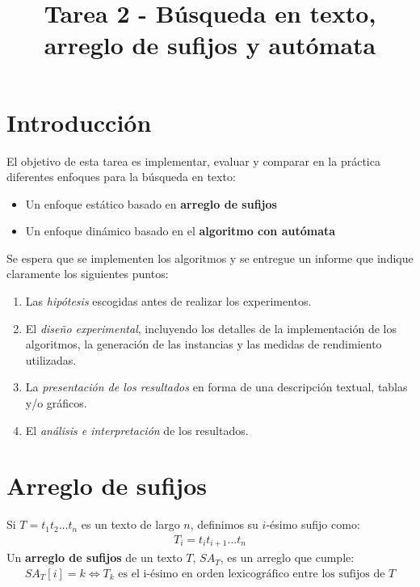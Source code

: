 \documentclass[dcc,uchile]{fcfmcourse}
\title{Tarea 2 - Búsqueda en texto, arreglo de sufijos y autómata}
\begin{document}
\captionsetup[table]{name=Tabla}
\captionsetup[table]{name=Figura}

\maketitle
\vspace{-1ex}
\section{Introducción}
El objetivo de esta tarea es implementar, evaluar y comparar en la práctica diferentes enfoques para la búsqueda en texto:
\begin{itemize}
    \item Un enfoque estático basado en \textbf{arreglo de sufijos}
    \item Un enfoque dinámico basado en el \textbf{algoritmo con autómata}
\end{itemize}
Se espera que se implementen los algoritmos y se entregue un informe que indique claramente los siguientes puntos:
\begin{enumerate}[1.]
    \item Las \textit{hipótesis} escogidas antes de realizar los experimentos.
    \item El \textit{diseño experimental}, incluyendo los detalles de la implementación de los algoritmos, la generación de las instancias y las medidas de rendimiento utilizadas.
    \item La \textit{presentación de los resultados} en forma de una descripción textual, tablas y/o gráficos.
    \item El \textit{análisis e interpretación} de los resultados.
\end{enumerate}
\section{Arreglo de sufijos}
Si $T=t_{1}t_{2}\ldots t_{n}$ es un texto de largo $n$, definimos su $i$-ésimo sufijo como:
\begin{align*}
    T_{i} = t_{i}t_{i+1}\ldots t_{n}
\end{align*}
Un \textbf{arreglo de sufijos} de un texto $T$, $SA_T$, es un arreglo que cumple:
\begin{align*}
    SA_T[i] = k \Leftrightarrow T_k\text{ es el i-ésimo en orden lexicográfico entre los sufijos de } T
\end{align*}
\newpage
\end{document}
